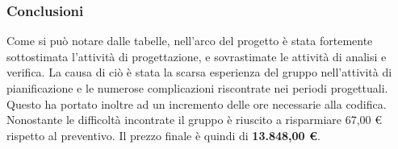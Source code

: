 \documentclass[./PianoDiProgetto.tex]{subfiles}
\begin{document}
\subsubsection{Conclusioni}	
Come si può notare dalle tabelle, nell'arco del progetto è stata fortemente sottostimata l'attività di progettazione, e sovrastimate le attività di analisi e verifica. La causa di ciò è stata la scarsa esperienza del gruppo nell'attività di pianificazione  e le numerose complicazioni riscontrate nei periodi progettuali. Questo ha portato inoltre ad un incremento delle ore necessarie alla codifica. \\
Nonostante le difficoltà incontrate il gruppo è riuscito a risparmiare 67,00 \euro{} rispetto al preventivo. Il prezzo finale è quindi di \textbf{13.848,00 \euro{}}.


\clearpage
\end{document}
